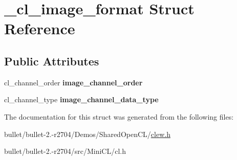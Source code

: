 \hypertarget{struct__cl__image__format}{\section{\+\_\+cl\+\_\+image\+\_\+format Struct Reference}
\label{struct__cl__image__format}
}
\subsection*{Public Attributes}
\begin{DoxyCompactItemize}
\item 
\hypertarget{struct__cl__image__format_aaedf0bf00bd2b217e865cad706bfad02}{cl\+\_\+channel\+\_\+order {\bfseries image\+\_\+channel\+\_\+order}}\label{struct__cl__image__format_aaedf0bf00bd2b217e865cad706bfad02}

\item 
\hypertarget{struct__cl__image__format_ae965ba5f74cd52eabffc4e0904adea34}{cl\+\_\+channel\+\_\+type {\bfseries image\+\_\+channel\+\_\+data\+\_\+type}}\label{struct__cl__image__format_ae965ba5f74cd52eabffc4e0904adea34}

\end{DoxyCompactItemize}


The documentation for this struct was generated from the following files\+:\begin{DoxyCompactItemize}
\item 
bullet/bullet-\/2.-\/r2704/\+Demos/\+Shared\+Open\+C\+L/\hyperlink{clew_8h}{clew.\+h}\item 
bullet/bullet-\/2.-\/r2704/src/\+Mini\+C\+L/cl.\+h\end{DoxyCompactItemize}
